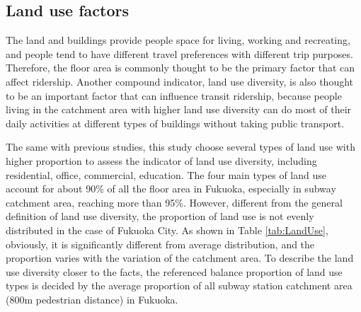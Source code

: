 \documentclass[utf8]{article}
\begin{document}
%
\subsection{Land use factors}
\indent

The land and buildings provide people space for living, working and recreating, and people tend to have different travel preferences with different trip purposes. Therefore, the floor area is commonly thought to be the primary factor that can affect ridership. Another compound indicator, land use diversity, is also thought to be an important factor that can influence transit ridership, because people living in the catchment area with higher land use diversity can do most of their daily activities at different types of buildings without taking public transport.

%
The same with previous studies, this study choose several types of land use with higher proportion to assess the indicator of land use diversity, including residential, office, commercial, education. The four main types of land use account for about 90\% of all the floor area in Fukuoka, especially in subway catchment area, reaching more than 95\%. However, different from the general definition of land use diversity, the proportion of land use is not evenly distributed in the case of Fukuoka City. As shown in Table \ref{tab:LandUse}, obviously, it is significantly different from average distribution, and the proportion varies with the variation of the catchment area. To describe the land use diversity closer to the facts, the referenced balance proportion of land use types is decided by the average proportion of all subway station catchment area (800m pedestrian distance) in Fukuoka.
\end{document}
